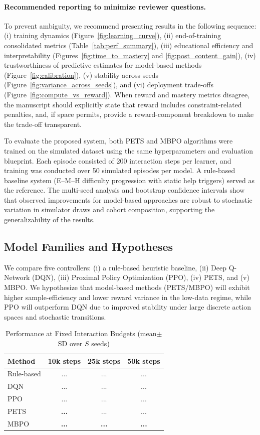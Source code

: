 \documentclass[preprint,12pt]{elsarticle}
\begin{document}
\begin{frontmatter}
\paragraph{Recommended reporting to minimize reviewer questions.}
To prevent ambiguity, we recommend presenting results in the following sequence: (i) training dynamics (Figure~\ref{fig:learning_curve}), (ii) end-of-training consolidated metrics (Table~\ref{tab:perf_summary}), (iii) educational efficiency and interpretability (Figures~\ref{fig:time_to_mastery} and \ref{fig:post_content_gain}), (iv) trustworthiness of predictive estimates for model-based methods (Figure~\ref{fig:calibration}), (v) stability across seeds (Figure~\ref{fig:variance_across_seeds}), and (vi) deployment trade-offs (Figure~\ref{fig:compute_vs_reward}). When reward and mastery metrics disagree, the manuscript should explicitly state that reward includes constraint-related penalties, and, if space permits, provide a reward-component breakdown to make the trade-off transparent.




To evaluate the proposed system, both PETS and MBPO algorithms were trained on the simulated dataset using the same hyperparameters and evaluation blueprint. Each episode consisted of 200 interaction steps per learner, and training was conducted over 50 simulated episodes per model. A rule-based baseline system (E–M–H difficulty progression with static help triggers) served as the reference. The multi-seed analysis and bootstrap confidence intervals show that observed improvements for model-based approaches are robust to stochastic variation in simulator draws and cohort composition, supporting the generalizability of the results.

\subsection{Model Families and Hypotheses}
We compare five controllers: (i) a rule-based heuristic baseline, (ii) Deep Q-Network (DQN), (iii) Proximal Policy Optimization (PPO), (iv) PETS, and (v) MBPO. 
We hypothesize that model-based methods (PETS/MBPO) will exhibit higher sample-efficiency and lower reward variance in the low-data regime, while PPO will outperform DQN due to improved stability under large discrete action spaces and stochastic transitions.

\begin{table}[t]
\centering
\caption{Performance at Fixed Interaction Budgets (mean$\pm$SD over $S$ seeds)}
\begin{tabular}{lccc}
\toprule
Method & 10k steps & 25k steps & 50k steps \\
\midrule
Rule-based & ... & ... & ... \\
DQN & ... & ... & ... \\
PPO & ... & ... & ... \\
PETS & \textbf{...} & ... & ... \\
MBPO & \textbf{...} & \textbf{...} & \textbf{...} \\
\bottomrule
\end{tabular}
\label{tab:budget_perf}
\end{table}


\end{frontmatter}
\end{document}
